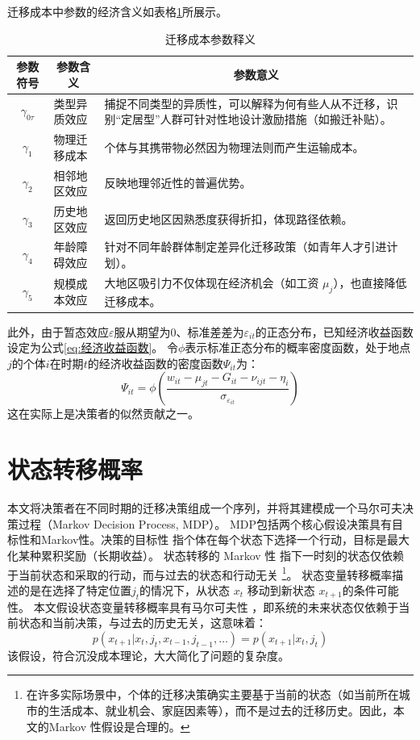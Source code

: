 \documentclass[a4paper,12pt,oneside, fontset=mac]{ctexbook} %
\begin{document}
迁移成本中参数的经济含义如表格\ref{tab:迁移成本参数释义}所展示。
\begin{table}[!ht]
  \centering
  \caption{迁移成本参数释义}
  \label{tab:迁移成本参数释义}
  \begin{tabularx}{\textwidth}{@{}llX@{}}
    \toprule
    \multicolumn{1}{c}{\textbf{参数符号}} & \multicolumn{1}{c}{\textbf{参数含义}} & \multicolumn{1}{c}{\textbf{参数意义}} \\ \midrule
    \multicolumn{1}{c}{$\gamma_{0\tau}$} & 类型异质效应 & 捕捉不同类型的异质性，可以解释为何有些人从不迁移，识别“定居型”人群可针对性地设计激励措施（如搬迁补贴）。\\ 
    \multicolumn{1}{c}{$\gamma_1$} & 物理迁移成本 & 个体与其携带物必然因为物理法则而产生运输成本。 \\ 
    \multicolumn{1}{c}{$\gamma_2$} & 相邻地区效应 & 反映地理邻近性的普遍优势。 \\ 
    \multicolumn{1}{c}{$\gamma_3$} & 历史地区效应 & 返回历史地区因熟悉度获得折扣，体现路径依赖。 \\ 
    \multicolumn{1}{c}{$\gamma_4$} & 年龄障碍效应 & 针对不同年龄群体制定差异化迁移政策（如青年人才引进计划）。\\ 
    \multicolumn{1}{c}{$\gamma_5$} & 规模成本效应 & 大地区吸引力不仅体现在经济机会（如工资 $\mu_j$），也直接降低迁移成本。\\ \bottomrule
  \end{tabularx}
\end{table}


此外，由于暂态效应$\varepsilon$服从期望为0、标准差差为\(\varepsilon_{it}\)的正态分布，已知经济收益函数设定为公式\ref{eq:经济收益函数}。
令$\phi$表示标准正态分布的概率密度函数，处于地点$j$的个体$i$在时期$t$的经济收益函数的密度函数$\Psi_{it}$为：
\begin{equation}
  \Psi_{it}=\phi(\frac{w_{it} - \mu_{jt} - G_{it} - \nu_{ijt} - \eta_i }{\sigma_{\varepsilon_{it}}})
  \label{eq:经济收益似然贡献}
\end{equation}
这在实际上是决策者的似然贡献之一。

\section{状态转移概率}

本文将决策者在不同时期的迁移决策组成一个序列，并将其建模成一个马尔可夫决策过程（Markov Decision Process, MDP）。
MDP包括两个核心假设决策具有目标性和Markov性。决策的目标性 指个体在每个状态下选择一个行动，目标是最大化某种累积奖励（长期收益）。
状态转移的 Markov 性 指下一时刻的状态仅依赖于当前状态和采取的行动，而与过去的状态和行动无关
\footnote{在许多实际场景中，个体的迁移决策确实主要基于当前的状态（如当前所在城市的生活成本、就业机会、家庭因素等），而不是过去的迁移历史。因此，本文的Markov 性假设是合理的。}。
状态变量转移概率描述的是在选择了特定位置$j_{t}$的情况下，从状态 $x_t$ 移动到新状态 $x_{t+1}$的条件可能性。
本文假设状态变量转移概率具有马尔可夫性
，即系统的未来状态仅依赖于当前状态和当前决策，与过去的历史无关，这意味着：
\begin{equation}
  p(x_{t+1}|x_{t},j_{t},x_{t-1},j_{t-1},\ldots)=p(x_{t+1}|x_{t},j_{t})
\end{equation}
该假设，符合沉没成本理论，大大简化了问题的复杂度。
\end{document}
